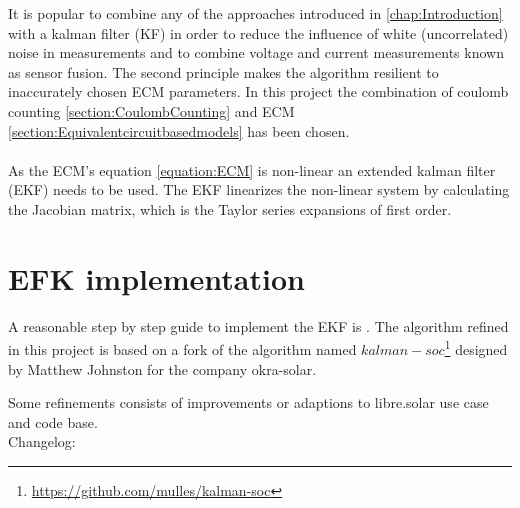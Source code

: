 It is popular to combine %
any of the approaches introduced in \ref{chap:Introduction} with a kalman filter (KF) in order to reduce the influence of white (uncorrelated) noise in measurements and to combine voltage and current measurements known as sensor fusion. The second principle makes the algorithm resilient to inaccurately chosen ECM parameters. In this project the combination of coulomb counting \ref{section:CoulombCounting} and ECM \ref{section:Equivalentcircuitbasedmodels} has been chosen. \\ %
\\
As the  ECM's equation \ref{equation:ECM}  is non-linear an extended kalman filter (EKF) needs to be used. The EKF linearizes the non-linear system by calculating the Jacobian matrix, which is the Taylor series expansions of first order.  %
\\

\section{EFK implementation}
\label{Fork}

A reasonable step by step guide to implement the EKF is \cite{rzepka2021implementing}. The algorithm refined in this project is based on a fork of the algorithm named $kalman-soc$\footnote{ \url{https://github.com/mulles/kalman-soc}} designed by Matthew Johnston for the company okra-solar. 

Some refinements consists of improvements or adaptions to libre.solar use case and code base.
 \\




Changelog: 



